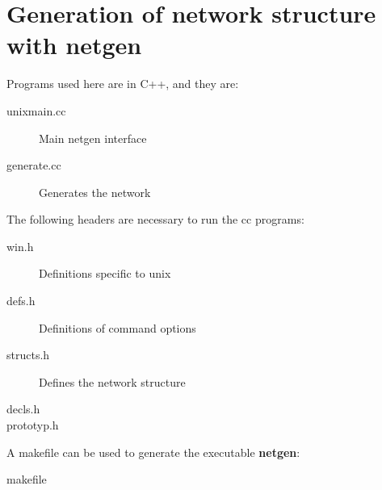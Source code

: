 \documentclass[12pt]{article}
\begin{document}
\section{Generation of network structure with netgen}
Programs used here are in C++, and they are:
\begin{description}
  \item[unixmain.cc] Main netgen interface
  \item[generate.cc] Generates the network
\end{description}
The following headers are necessary to run the cc programs:
\begin{description}
  \item[win.h] Definitions specific to unix
  \item[defs.h] Definitions of command options
  \item[structs.h] Defines the network structure 
  \item[decls.h] 
  \item[prototyp.h]
\end{description}
A makefile can be used to generate the executable {\bf netgen}:
\begin{description}
  \item[makefile]
\end{description}

\end{document}
